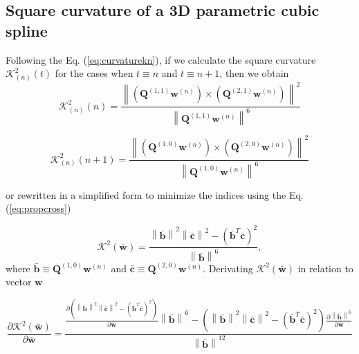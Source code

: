 \subsection{Square curvature of a 3D parametric cubic spline}
\label{sec:curvaturemain}

Following the Eq. (\ref{eq:curvaturekn}), 
if we calculate the square curvature $\mathcal{K}_{(n)}^{2}(t)$ for the cases when $t\equiv n$ and $t\equiv n+1$,
then we obtain
\begin{equation}\label{eq:curvature:K2nn}
\mathcal{K}_{(n)}^{2}(n)
=
\frac{\left\|
\left( \mathbf{Q}^{(1,1)} \mathbf{w}^{(n)} \right)
\times 
\left( \mathbf{Q}^{(2,1)} \mathbf{w}^{(n)} \right)
\right\|^{2}}
{\left\| \mathbf{Q}^{(1,1)} \mathbf{w}^{(n)} \right\|^{6}}
\end{equation}

\begin{equation}\label{eq:curvature:K2nn1}
\mathcal{K}_{(n)}^{2}(n+1)
=
\frac{\left\|
\left( \mathbf{Q}^{(1,0)} \mathbf{w}^{(n)} \right)
\times 
\left( \mathbf{Q}^{(2,0)} \mathbf{w}^{(n)} \right)
\right\|^{2}}
{\left\| \mathbf{Q}^{(1,0)} \mathbf{w}^{(n)} \right\|^{6}}
\end{equation}


or rewritten in a simplified form to minimize the indices using the Eq. (\ref{eq:propcross})

\begin{equation}
\mathcal{K}^{2}(\mathbf{\bar{w}})
=
\frac{
\left\|
\mathbf{\bar{b}} 
\right\|^{2}
\left\|
\mathbf{\bar{c}}
\right\|^{2}
-
\left(
\mathbf{\bar{b}}^{T}
\mathbf{\bar{c}}
\right)^{2}
}
{\left\| \mathbf{\bar{b}} \right\|^{6}},
\end{equation}
where $\mathbf{\bar{b}} \equiv \mathbf{Q}^{(1,0)} \mathbf{w}^{(n)}$ and $\mathbf{\bar{c}} \equiv \mathbf{Q}^{(2,0)} \mathbf{w}^{(n)}$.
Derivating $\mathcal{K}^{2}(\mathbf{\bar{w}})$ in relation to vector $\mathbf{w}$

\begin{equation}
\frac{
\partial 
\mathcal{K}^{2}(\mathbf{\bar{w}})
}
{
\partial \mathbf{\bar{w}}
}
=
\frac{
\frac{
\partial 
\left(
\left\|
\mathbf{\bar{b}} 
\right\|^{2}
\left\|
\mathbf{\bar{c}}
\right\|^{2}
-
\left(
\mathbf{\bar{b}}^{T}
\mathbf{\bar{c}}
\right)^{2}
\right)
}
{\partial \mathbf{\bar{w}}}
\left\| \mathbf{\bar{b}} \right\|^{6}
-
\left(
\left\|
\mathbf{\bar{b}} 
\right\|^{2}
\left\|
\mathbf{\bar{c}}
\right\|^{2}
-
\left(
\mathbf{\bar{b}}^{T}
\mathbf{\bar{c}}
\right)^{2}
\right)
\frac{
\partial
\left\| \mathbf{\bar{b}} \right\|^{6}
}
{
\partial \mathbf{\bar{w}}
}
}
{\left\| \mathbf{\bar{b}} \right\|^{12}}
\end{equation}



